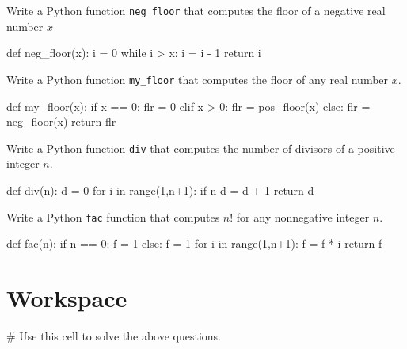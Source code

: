 \documentclass{ximera}
\begin{document}
\begin{question}
	Write a Python function \verb|neg_floor| that computes the floor of a negative real number $x$
\begin{hint}
\begin{sageCell}
def neg_floor(x):
        i = 0
        while i > x:
                i = i - 1
        return i
\end{sageCell}
\end{hint}
\end{question}

\begin{question}
	Write a Python function \verb|my_floor| that computes the floor of any real number $x$.
\begin{hint}
\begin{sageCell}
def my_floor(x):
        if x == 0:
                flr = 0
        elif x > 0:
                flr = pos_floor(x)
        else:
                flr = neg_floor(x)
        return flr
\end{sageCell}
\end{hint}
\end{question}

\begin{question}
	Write a Python function \verb|div| that computes the number of divisors of a positive integer $n$.
\begin{hint}
\begin{sageCell}
def div(n):
        d = 0
        for i in range(1,n+1):
                if n%
                        d = d + 1
        return d
\end{sageCell}
\end{hint}
\end{question}

\begin{question}
	Write a Python \verb|fac| function that computes $n!$ for any nonnegative integer $n$.
\begin{hint}
\begin{sageCell}
def fac(n):
        if n == 0:
                f = 1
        else:
                f = 1
                for i in range(1,n+1):
                        f = f * i
        return f
\end{sageCell}
\end{hint}
\end{question}

\section{Workspace}

\begin{sageCell}
# Use this cell to solve the above questions.
\end{sageCell}
\end{document}
